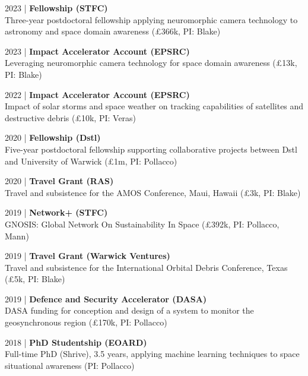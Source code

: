 \vspace{1em}

\justify
\vspace{-1em}
\small 2023 | \textbf{Fellowship (STFC)} \\
Three-year postdoctoral fellowship applying neuromorphic camera technology to astronomy and space domain awareness (£366k, PI: Blake)

\divider

\small 2023 | \textbf{Impact Accelerator Account (EPSRC)} \\
Leveraging neuromorphic camera technology for space domain awareness (£13k, PI: Blake)

\divider

\small 2022 | \textbf{Impact Accelerator Account (EPSRC)} \\
Impact of solar storms and space weather on tracking capabilities of satellites and destructive debris (£10k, PI: Veras)

\divider

\small 2020 | \textbf{Fellowship (Dstl)} \\
Five-year postdoctoral fellowship supporting collaborative projects between Dstl and University of Warwick (£1m, PI: Pollacco)

\divider

\small 2020 | \textbf{Travel Grant (RAS)} \\
Travel and subsistence for the AMOS Conference, Maui, Hawaii (£3k, PI: Blake)

\divider

\small 2019 | \textbf{Network+ (STFC)} \\
GNOSIS: Global Network On Sustainability In Space (£392k, PI: Pollacco, Mann)

\divider

\small 2019 | \textbf{Travel Grant (Warwick Ventures)} \\
Travel and subsistence for the International Orbital Debris Conference, Texas (£5k, PI: Blake)

\divider

\small 2019 | \textbf{Defence and Security Accelerator (DASA)} \\
DASA funding for conception and design of a system to monitor the geosynchronous region (£170k, PI: Pollacco)

\divider

\small 2018 | \textbf{PhD Studentship (EOARD)} \\
Full-time PhD (Shrive), 3.5 years, applying machine learning techniques to space situational awareness (PI: Pollacco)

